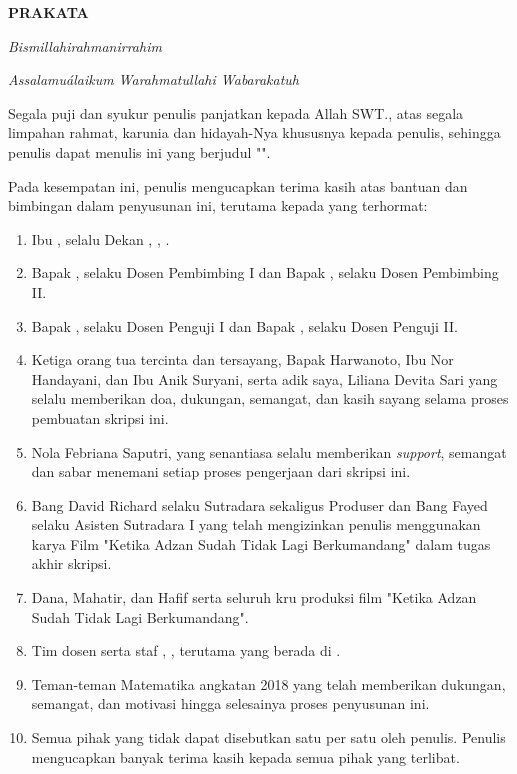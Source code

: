

\frenchspacing
{
    {\onehalfspacing
            \begin{center}
                \textbf{PRAKATA}
            \end{center}
        }

        {\noindent
            \textit{Bismillahirahmanirrahim} \par \noindent
            \textit{Assalamu\'alaikum Warahmatullahi Wabarakatuh}
        }

    Segala puji dan syukur penulis panjatkan kepada Allah SWT., atas segala limpahan rahmat,
    karunia dan hidayah-Nya khususnya kepada penulis, sehingga penulis dapat menulis \MakeLowercase{\tipe} ini
    yang berjudul "\judul".

    Pada kesempatan ini, penulis mengucapkan terima kasih atas bantuan dan bimbingan dalam penyusunan \MakeLowercase{\tipe} ini,
    terutama kepada yang terhormat:

    \begin{enumerate}[label = \arabic*., align = left, left = 0cm, labelsep = 0.35cm, nolistsep]
        \item Ibu \dekan, selalu Dekan \fakultas, \institut, \kota.
        \item Bapak \pembimbinga, selaku Dosen Pembimbing I dan Bapak \pembimbingb, selaku Dosen Pembimbing II.
        \item Bapak \pengujia, selaku Dosen Penguji I dan Bapak \pengujib, selaku Dosen Penguji II.
        \item Ketiga orang tua tercinta dan tersayang, Bapak Harwanoto, Ibu Nor Handayani, dan Ibu Anik Suryani, serta adik saya, Liliana Devita Sari yang selalu memberikan doa,
              dukungan, semangat, dan kasih sayang selama proses pembuatan skripsi ini.
        \item Nola Febriana Saputri, yang senantiasa selalu memberikan \textit{support}, semangat dan sabar menemani setiap proses pengerjaan dari skripsi ini.
        \item Bang David Richard selaku Sutradara sekaligus Produser dan Bang Fayed selaku Asisten Sutradara I yang telah mengizinkan penulis menggunakan karya Film "Ketika Adzan Sudah Tidak Lagi Berkumandang" dalam tugas akhir skripsi.
        \item Dana, Mahatir, dan Hafif serta seluruh kru produksi film "Ketika Adzan Sudah Tidak Lagi Berkumandang".
        \item Tim dosen serta staf \fakultas, \institut, terutama yang berada di \prodi.
        \item Teman-teman Matematika angkatan 2018 yang telah memberikan dukungan, semangat, dan motivasi hingga selesainya proses penyusunan \MakeLowercase{\tipe} ini.
        \item Semua pihak yang tidak dapat disebutkan satu per satu oleh penulis. Penulis mengucapkan banyak terima kasih kepada semua pihak yang terlibat.
    \end{enumerate}

}
